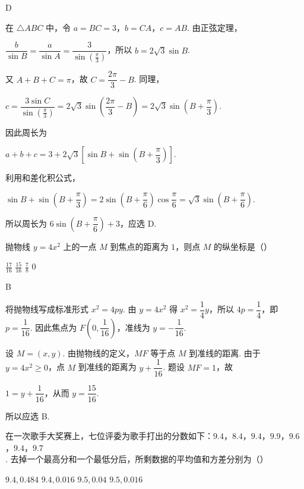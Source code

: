 \begin{answer}
D
\end{answer}

\begin{solution}
在 \(\triangle ABC\) 中，令 \(a=BC=3\)，\(b=CA\)，\(c=AB\). 由正弦定理，

\(\dfrac{b}{\sin B}=\dfrac{a}{\sin A}=\dfrac{3}{\sin(\frac{\pi}{3})}\)，所以 \(b=2\sqrt{3}\sin B\).

又 \(A+B+C=\pi\)，故 \(C=\dfrac{2\pi}{3}-B\). 同理，

\(c=\dfrac{3\sin C}{\sin(\frac{\pi}{3})}=2\sqrt{3}\sin\left(\dfrac{2\pi}{3}-B\right)=2\sqrt{3}\sin\left(B+\dfrac{\pi}{3}\right)\).

因此周长为

\(a+b+c=3+2\sqrt{3}\left[\sin B+\sin\left(B+\dfrac{\pi}{3}\right)\right]\).

利用和差化积公式，

\(\sin B+\sin\left(B+\dfrac{\pi}{3}\right)=2\sin\left(B+\dfrac{\pi}{6}\right)\cos\dfrac{\pi}{6}=\sqrt{3}\sin\left(B+\dfrac{\pi}{6}\right)\).

所以周长为 \(6\sin\left(B+\dfrac{\pi}{6}\right)+3\)，应选 D.
\end{solution}

\begin{problem}
抛物线 \(y = 4x^{2}\) 上的一点 \(M\) 到焦点的距离为 \(1\)，则点 \(M\) 的纵坐标是（\quad）

\choices
    {\(\frac{17}{16}\)}
    {\(\frac{15}{16}\)}
    {\(\frac{7}{8}\)}
    {\(0\)}
\end{problem}

\begin{answer}
B
\end{answer}

\begin{solution}
将抛物线写成标准形式 \(x^2=4py\). 由 \(y=4x^2\) 得 \(x^2=\dfrac14y\)，所以 \(4p=\dfrac14\)，即 \(p=\dfrac1{16}\). 因此焦点为 \(F\left(0,\dfrac1{16}\right)\)，准线为 \(y=-\dfrac1{16}\).

设 \(M=(x,y)\). 由抛物线的定义，\(MF\) 等于点 \(M\) 到准线的距离. 由于 \(y=4x^2\geqslant0\)，点 \(M\) 到准线的距离为 \(y+\dfrac1{16}\). 题设 \(MF=1\)，故

\(1=y+\dfrac1{16}\)，从而 \(y=\dfrac{15}{16}\).

所以应选 B.
\end{solution}

\begin{problem}
在一次歌手大奖赛上，七位评委为歌手打出的分数如下：\(9.4\)，\(8.4\)，\(9.4\)，\(9.9\)，\(9.6\)，\(9.4\)，\(9.7\). 去掉一个最高分和一个最低分后，所剩数据的平均值和方差分别为（\quad）

\choices
    {\(9.4, 0.484\)}
    {\(9.4, 0.016\)}
    {\(9.5, 0.04\)}
    {\(9.5, 0.016\)}
\end{problem}

